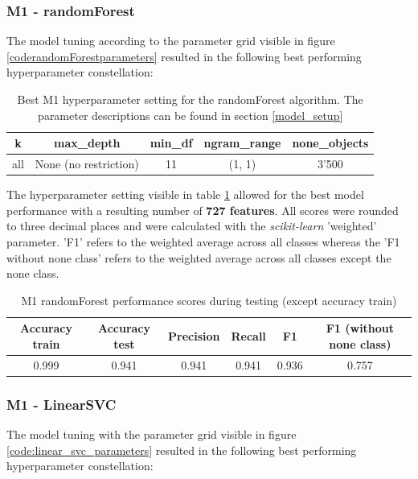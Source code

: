 \subsubsection{M1 - randomForest}
The model tuning according to the parameter grid visible in figure \ref{coderandomForestparameters} resulted in the following best performing hyperparameter constellation:

\begin{table}[h!]
\begin{center}
\caption{Best M1 hyperparameter setting for the randomForest algorithm. The parameter descriptions can be found in section \ref{model_setup}}\vspace{1ex}
\label{tab:m1_randomForest_bestParams}
\begin{tabular}{ccccc}\hline
k & max\_depth & min\_df & ngram\_range & none\_objects \\ \hline
all & None (no restriction) & 11 & (1, 1) & 3'500 \\ \hline
\end{tabular}
\end{center}
\end{table}

The hyperparameter setting visible in table \ref{tab:m1_randomForest_bestParams} allowed for the best model performance with a resulting number of \textbf{727 features}. All scores were rounded to three decimal places and were calculated with the \textit{scikit-learn} 'weighted' parameter. 'F1' refers to the weighted average across all classes whereas the 'F1 without none class' refers to the weighted average across all classes except the none class.

\begin{table}[h!]
\begin{center}
\caption{M1 randomForest performance scores during testing (except accuracy train)}\vspace{1ex}
\label{tab:m1_randomForest_bestscores}
\begin{tabular}{cccccc}\hline
Accuracy train & Accuracy test & Precision & Recall & F1 & F1 (without none class)\\ \hline
0.999 & 0.941 & 0.941 & 0.941 & 0.936 & 0.757 \\ \hline
\end{tabular}
\end{center}
\end{table}

\subsubsection{M1 - LinearSVC}
The model tuning with the parameter grid visible in figure \ref{code:linear_svc_parameters} resulted in the following best performing hyperparameter constellation:

